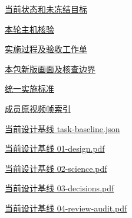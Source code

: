 \documentclass[11pt,a4paper]{article}
\begin{document}
\href{file:///D:/Agent/srp/agent/tasks/I-01/outputs/current-integration.json}{当前状态和未冻结目标}


\href{file:///D:/Agent/srp/agent/tasks/I-01/evidence/verification.json}{本轮主机核验}


\href{file:///D:/Agent/srp/agent/tasks/I-01/TASK.md}{实施过程及验收工作单}


\href{file:///D:/Agent/srp/agent/tasks/I-01/outputs/current-implementation-evidence.md}{本包新版画面及核查边界}


\href{file:///D:/Agent/srp/agent/design/weather/2026-10-08_Storm\%E4\%B8\%8E\%E7\%BA\%AF\%E7\%B2\%92\%E5\%AD\%90\%E5\%8F\%8C\%E7\%8E\%AF\%E5\%AE\%9E\%E6\%96\%BD\%E6\%A0\%87\%E5\%87\%86.md}{统一实施标准}


\href{file:///D:/Agent/srp/human/assets/previews/2026-10-08/member-storm-particle-rings/frame-index.json}{成员原视频帧索引}


\href{file:///D:/Agent/srp/agent/design/design-foundation-20261008/task-baseline.json}{当前设计基线 task-\allowbreak{}baseline.json}


\href{file:///D:/Agent/srp/agent/design/design-foundation-20261008/01-design.pdf}{当前设计基线 01-\allowbreak{}design.pdf}


\href{file:///D:/Agent/srp/agent/design/design-foundation-20261008/02-science.pdf}{当前设计基线 02-\allowbreak{}science.pdf}


\href{file:///D:/Agent/srp/agent/design/design-foundation-20261008/03-decisions.pdf}{当前设计基线 03-\allowbreak{}decisions.pdf}


\href{file:///D:/Agent/srp/agent/design/design-foundation-20261008/04-review-audit.pdf}{当前设计基线 04-\allowbreak{}review-\allowbreak{}audit.pdf}
\end{document}

